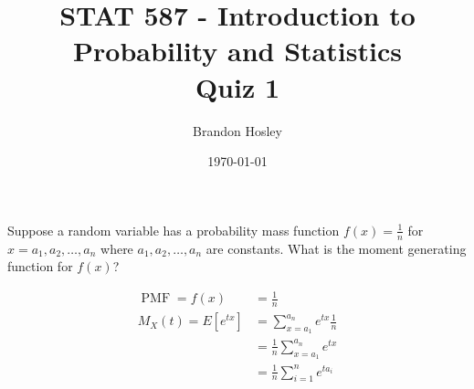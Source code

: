 \documentclass[answers]{exam}
\title{STAT 587 - Introduction to Probability and Statistics%
	\\ Quiz 1}
\author{Brandon Hosley}
\date{\today}
\begin{document}
\maketitle
\begin{questions}

\question 
Suppose a random variable has a probability mass function 
\(f(x)= \frac{1}{n}\) for 
\(x=a_1,a_2,\ldots,a_n\) where 
\(a_1,a_2,\ldots,a_n\) are constants. What is the moment generating function for 
\(f(x)\)?
\begin{solution}
	\begin{align*}
		\operatorname{PMF} = f(x) &= \frac{1}{n} \\
		M_X(t) = E[e^{tx}] &= \sum_{x=a_1}^{a_n}e^{tx}\frac{1}{n} \\
		&= \frac{1}{n}\sum_{x=a_1}^{a_n}e^{tx} \\
		&= \frac{1}{n}\sum_{i=1}^{n}e^{ta_i}
	\end{align*}
\end{solution}


\end{questions}
\end{document}
